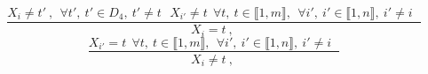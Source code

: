 $$\frac{X_{i} \neq t'~,~~\forall t',~t' \in D_{4},~t' \neq t~~~X_{i'} \neq t~~\forall t,~t \in \llbracket1,m\rrbracket,~~\forall i',~i' \in \llbracket1,n\rrbracket,~i' \neq i~~~}{X_{i}=t~,~}$$ $$\frac{X_{i'}=t~~\forall t,~t \in \llbracket1,m\rrbracket,~~\forall i',~i' \in \llbracket1,n\rrbracket,~i' \neq i~~~}{X_{i} \neq t~,~}$$ 